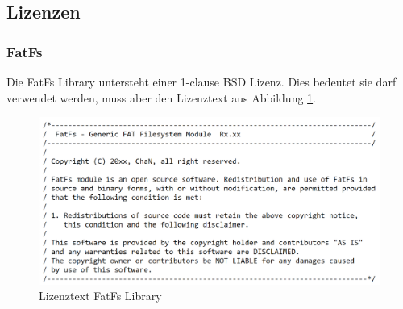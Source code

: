 \subsection{Lizenzen}\label{sec:lizenzen}

\subsubsection{FatFs}
Die FatFs Library untersteht einer 1-clause BSD Lizenz. Dies bedeutet sie darf verwendet werden, muss aber den Lizenztext aus Abbildung \ref{fig Lizenztext FatFs}.


\begin{figure}[ht!]
\includegraphics[width = 140mm]{data/Lizenztext_FatFs.png}
\caption{Lizenztext FatFs Library}
\label{fig Lizenztext FatFs}
\end{figure}
